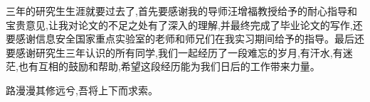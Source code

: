 
\begin{acknowledgements}

三年的研究生生涯就要过去了,首先要感谢我的导师汪增福教授给予的耐心指导和宝贵意见,让我对论文的不足之处有了深入的理解,并最终完成了毕业论文的写作,还要感谢信息安全国家重点实验室的老师和师兄们在我实习期间给予的指导。最后还要感谢研究生三年认识的所有同学,我们一起经历了一段难忘的岁月,有汗水,有迷茫,也有互相的鼓励和帮助,希望这段经历能为我们日后的工作带来力量。


路漫漫其修远兮,吾将上下而求索。

\end{acknowledgements}
